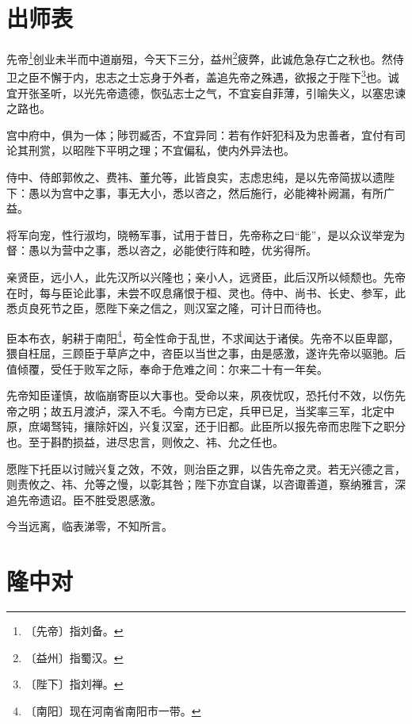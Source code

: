 \documentclass[12pt,UTF-8,openany]{ctexbook}
\begin{document}
\chapter{出师表}

\begin{normalsize}
    
    先帝\footnote{〔先帝〕指刘备。}创业未半而中道崩殂，今天下三分，益州\footnote{〔益州〕指蜀汉。}疲弊，此诚危急存亡之秋也。然侍卫之臣不懈于内，忠志之士忘身于外者，盖追先帝之殊遇，欲报之于陛下\footnote{〔陛下〕指刘禅。}也。诚宜开张圣听，以光先帝遗德，恢弘志士之气，不宜妄自菲薄，引喻失义，以塞忠谏之路也。
    
    宫中府中，俱为一体；陟罚臧否，不宜异同：若有作奸犯科及为忠善者，宜付有司论其刑赏，以昭陛下平明之理；不宜偏私，使内外异法也。
    
    侍中、侍郎郭攸之、费祎、董允等，此皆良实，志虑忠纯，是以先帝简拔以遗陛下：愚以为宫中之事，事无大小，悉以咨之，然后施行，必能裨补阙漏，有所广益。
    
    将军向宠，性行淑均，晓畅军事，试用于昔日，先帝称之曰“能”，是以众议举宠为督：愚以为营中之事，悉以咨之，必能使行阵和睦，优劣得所。
    
    亲贤臣，远小人，此先汉所以兴隆也；亲小人，远贤臣，此后汉所以倾颓也。先帝在时，每与臣论此事，未尝不叹息痛恨于桓、灵也。侍中、尚书、长史、参军，此悉贞良死节之臣，愿陛下亲之信之，则汉室之隆，可计日而待也。
    
    臣本布衣，躬耕于南阳\footnote{〔南阳〕现在河南省南阳市一带。}，苟全性命于乱世，不求闻达于诸侯。先帝不以臣卑鄙，猥自枉屈，三顾臣于草庐之中，咨臣以当世之事，由是感激，遂许先帝以驱驰。后值倾覆，受任于败军之际，奉命于危难之间：尔来二十有一年矣。
    
    先帝知臣谨慎，故临崩寄臣以大事也。受命以来，夙夜忧叹，恐托付不效，以伤先帝之明；故五月渡泸，深入不毛。今南方已定，兵甲已足，当奖率三军，北定中原，庶竭驽钝，攘除奸凶，兴复汉室，还于旧都。此臣所以报先帝而忠陛下之职分也。至于斟酌损益，进尽忠言，则攸之、祎、允之任也。
    
    愿陛下托臣以讨贼兴复之效，不效，则治臣之罪，以告先帝之灵。若无兴德之言，则责攸之、祎、允等之慢，以彰其咎；陛下亦宜自谋，以咨诹善道，察纳雅言，深追先帝遗诏。臣不胜受恩感激。
    
    今当远离，临表涕零，不知所言。
\end{normalsize}



\chapter{隆中对}
\end{document}
